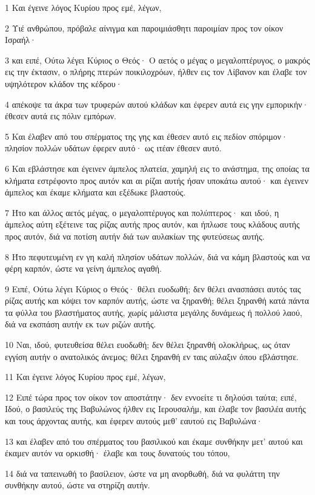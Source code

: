 \par 1 Και έγεινε λόγος Κυρίου προς εμέ, λέγων,
\par 2 Υιέ ανθρώπου, πρόβαλε αίνιγμα και παροιμιάσθητι παροιμίαν προς τον οίκον Ισραήλ·
\par 3 και ειπέ, Ούτω λέγει Κύριος ο Θεός· Ο αετός ο μέγας ο μεγαλοπτέρυγος, ο μακρός εις την έκτασιν, ο πλήρης πτερών ποικιλοχρόων, ήλθεν εις τον Λίβανον και έλαβε τον υψηλότερον κλάδον της κέδρου·
\par 4 απέκοψε τα άκρα των τρυφερών αυτού κλάδων και έφερεν αυτά εις γην εμπορικήν· έθεσεν αυτά εις πόλιν εμπόρων.
\par 5 Και έλαβεν από του σπέρματος της γης και έθεσεν αυτό εις πεδίον σπόριμον· πλησίον πολλών υδάτων έφερεν αυτό· ως ιτέαν έθεσεν αυτό.
\par 6 Και εβλάστησε και έγεινεν άμπελος πλατεία, χαμηλή εις το ανάστημα, της οποίας τα κλήματα εστρέφοντο προς αυτόν και αι ρίζαι αυτής ήσαν υποκάτω αυτού· και έγεινεν άμπελος και έκαμε κλήματα και εξέδωκε βλαστούς.
\par 7 Ήτο και άλλος αετός μέγας, ο μεγαλοπτέρυγος και πολύπτερος· και ιδού, η άμπελος αύτη εξέτεινε τας ρίζας αυτής προς αυτόν, και ήπλωσε τους κλάδους αυτής προς αυτόν, διά να ποτίση αυτήν διά των αυλακίων της φυτεύσεως αυτής.
\par 8 Ήτο πεφυτευμένη εν γη καλή πλησίον υδάτων πολλών, διά να κάμη βλαστούς και να φέρη καρπόν, ώστε να γείνη άμπελος αγαθή.
\par 9 Ειπέ, Ούτω λέγει Κύριος ο Θεός· θέλει ευοδωθή; δεν θέλει ανασπάσει αυτός τας ρίζας αυτής και κόψει τον καρπόν αυτής, ώστε να ξηρανθή; θέλει ξηρανθή κατά πάντα τα φύλλα του βλαστήματος αυτής, χωρίς μάλιστα μεγάλης δυνάμεως ή πολλού λαού, διά να εκσπάση αυτήν εκ των ριζών αυτής.
\par 10 Ναι, ιδού, φυτευθείσα θέλει ευοδωθή; δεν θέλει ξηρανθή ολοκλήρως, ως όταν εγγίση αυτήν ο ανατολικός άνεμος; θέλει ξηρανθή εν ταις αύλαξιν όπου εβλάστησε.
\par 11 Και έγεινε λόγος Κυρίου προς εμέ, λέγων,
\par 12 Ειπέ τώρα προς τον οίκον τον αποστάτην· δεν εννοείτε τι δηλούσι ταύτα; ειπέ, Ιδού, ο βασιλεύς της Βαβυλώνος ήλθεν εις Ιερουσαλήμ, και έλαβε τον βασιλέα αυτής και τους άρχοντας αυτής, και έφερεν αυτούς μεθ' εαυτού εις Βαβυλώνα·
\par 13 και έλαβεν από του σπέρματος του βασιλικού και έκαμε συνθήκην μετ' αυτού και έκαμεν αυτόν να ορκισθή· έλαβε και τους δυνατούς του τόπου,
\par 14 διά να ταπεινωθή το βασίλειον, ώστε να μη ανορθωθή, διά να φυλάττη την συνθήκην αυτού, ώστε να στηρίζη αυτήν.
